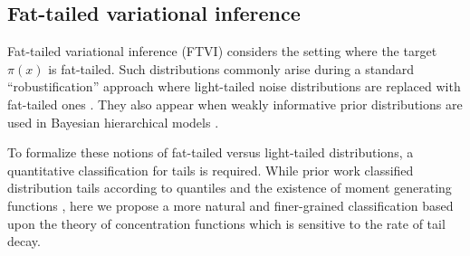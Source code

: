 \documentclass{article}
\theoremstyle{definition}
\theoremstyle{remark}
\begin{document}
\vspace{-2mm}
\subsection{Fat-tailed variational inference}

\vspace{-1mm}
Fat-tailed variational inference (FTVI)
considers the setting where the target $\pi(x)$ is fat-tailed. 
Such distributions commonly arise during a standard
``robustification'' approach where light-tailed noise distributions are
replaced with fat-tailed ones \cite{tipping2005variational}. They also
appear when weakly informative prior distributions are used in Bayesian
hierarchical models \cite{gelman2006prior}.




To formalize these notions of fat-tailed versus light-tailed distributions, a quantitative classification for tails is required.
While prior work classified distribution tails according to quantiles and the existence of moment generating functions
\citep[Section 3]{jaini2020tails}, here we propose a more natural and finer-grained classification based upon
the theory of concentration functions \citep[Chapter 1.2]{ledoux2001concentration} which is sensitive to
the rate of tail decay.
\end{document}
